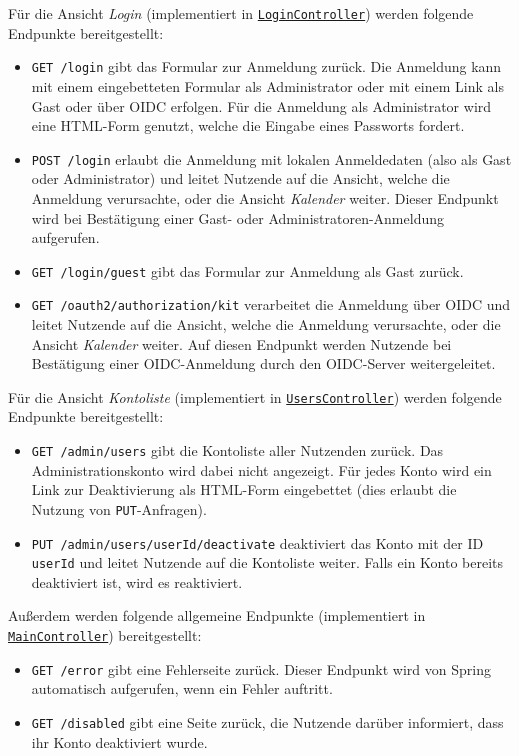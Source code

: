 Für die Ansicht \textit{Login} (implementiert in \hyperref[edu.kit.hci.soli.controller.LoginController]{\texttt{LoginController}}) werden folgende Endpunkte bereitgestellt:
\begin{itemize}
    \item \texttt{GET /login} gibt das Formular zur Anmeldung zurück. Die Anmeldung kann mit einem eingebetteten Formular als Administrator oder mit einem Link als Gast oder über \gls{OIDC} erfolgen.
          Für die Anmeldung als Administrator wird eine \gls{HTML-Form} genutzt, welche die Eingabe eines Passworts fordert.
    \item \texttt{POST /login} erlaubt die Anmeldung mit lokalen Anmeldedaten (also als Gast oder Administrator) und leitet Nutzende auf die Ansicht, welche die Anmeldung verursachte, oder die Ansicht \textit{Kalender} weiter.
          Dieser Endpunkt wird bei Bestätigung einer Gast- oder Administratoren-Anmeldung aufgerufen.
    \item \texttt{GET /login/guest} gibt das Formular zur Anmeldung als Gast zurück.
    \item \texttt{GET /oauth2/authorization/kit} verarbeitet die Anmeldung über \gls{OIDC} und leitet Nutzende auf die Ansicht, welche die Anmeldung verursachte, oder die Ansicht \textit{Kalender} weiter.
          Auf diesen Endpunkt werden Nutzende bei Bestätigung einer \gls{OIDC}-Anmeldung durch den OIDC-Server weitergeleitet.
\end{itemize}

Für die Ansicht \textit{Kontoliste} (implementiert in \hyperref[edu.kit.hci.soli.controller.UsersController]{\texttt{UsersController}}) werden folgende Endpunkte bereitgestellt:
\begin{itemize}
    \item \texttt{GET /admin/users} gibt die Kontoliste aller Nutzenden zurück. Das Administrationskonto wird dabei nicht angezeigt.
          Für jedes Konto wird ein Link zur Deaktivierung als \gls{HTML-Form} eingebettet (dies erlaubt die Nutzung von \texttt{PUT}-Anfragen).
    \item \texttt{PUT /admin/users/{userId}/deactivate} deaktiviert das Konto mit der ID \texttt{userId} und leitet Nutzende auf die Kontoliste weiter.
          Falls ein Konto bereits deaktiviert ist, wird es reaktiviert.
\end{itemize}

Außerdem werden folgende allgemeine Endpunkte (implementiert in \hyperref[edu.kit.hci.soli.controller.MainController]{\texttt{MainController}}) bereitgestellt:
\begin{itemize}
    \item \texttt{GET /error} gibt eine Fehlerseite zurück. Dieser Endpunkt wird von Spring automatisch aufgerufen, wenn ein Fehler auftritt.
    \item \texttt{GET /disabled} gibt eine Seite zurück, die Nutzende darüber informiert, dass ihr Konto deaktiviert wurde.
\end{itemize}

